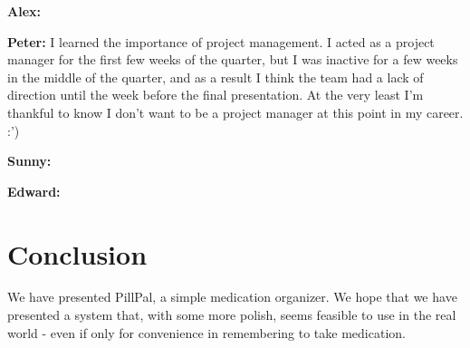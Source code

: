 \documentclass[sigconf]{acmart}
\begin{document}
\textbf{Alex:}

\textbf{Peter:} I learned the importance of project management. I acted as a project manager for the first few weeks of the quarter, but I was inactive for a few weeks in the middle of the quarter, and as a result I think the team had a lack of direction until the week before the final presentation. At the very least I'm thankful to know I don't want to be a project manager at this point in my career. :')

\textbf{Sunny:}

\textbf{Edward:}

\section{Conclusion}
We have presented PillPal, a simple medication organizer. We hope that we have presented a system that, with some more polish, seems feasible to use in the real world - even if only for convenience in remembering to take medication.



\end{document}
